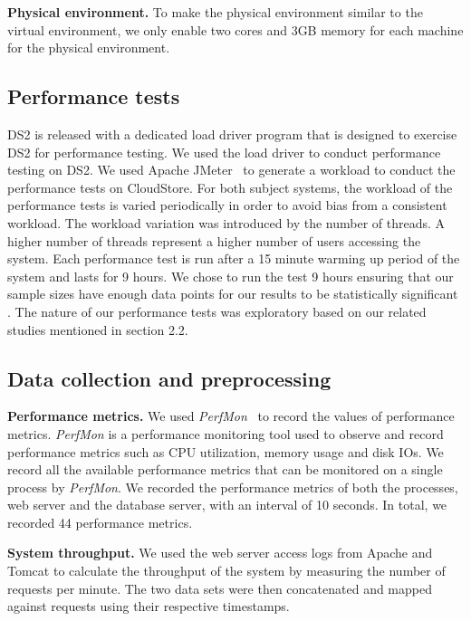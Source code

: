 \documentclass[smallextended]{svjour3}       %
\begin{document}
\noindent \textbf{Physical environment.} To make the physical environment similar to the virtual environment, we only enable two cores and 3GB memory for each machine for the physical environment. 

\subsection{Performance tests}

DS2 is released with a dedicated load driver program that is designed to exercise DS2 for performance testing. We used the load driver to conduct performance testing on DS2. We used Apache JMeter~\cite{apachejmeter} to generate a workload to conduct the performance tests on CloudStore. For both subject systems, the workload of the performance tests is varied periodically in order to avoid bias from a consistent workload. The workload variation was introduced by the number of threads. A higher number of threads represent a higher number of users accessing the system. Each performance test is run after a 15 minute warming up period of the system and lasts for 9 hours. We chose to run the test 9 hours ensuring that our sample sizes have enough data points for our results to be statistically significant \cite{statistical_significance}.
The nature of our performance tests was exploratory based on our related studies mentioned in section 2.2.


\subsection{Data collection and preprocessing}

\noindent \textbf{Performance metrics.} We used \textit{PerfMon}~\cite{perfmon} to record the values of performance metrics. \textit{PerfMon} is a performance monitoring tool used to observe and record performance metrics such as CPU utilization, memory usage and disk IOs. We record all the available performance metrics that can be monitored on a single process by \emph{PerfMon}.  We recorded the performance metrics of both the processes, web server and the database server, with an interval of 10 seconds. In total, we recorded 44 performance metrics. 

\noindent \textbf{System throughput.} We used the web server access logs from Apache and Tomcat to calculate the throughput of the system by measuring the number of requests per minute. The two data sets were then concatenated and mapped against requests using their respective timestamps.
\end{document}
